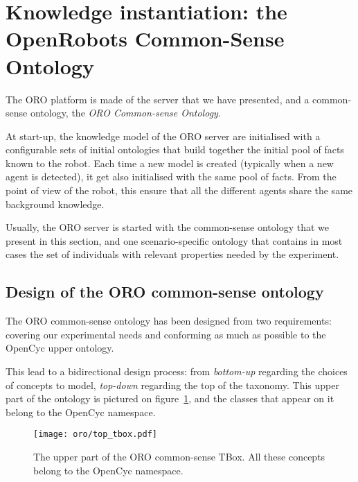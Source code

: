 
\section{Knowledge instantiation: the OpenRobots Common-Sense Ontology}

The ORO platform is made of the server that we have presented, and a
common-sense ontology, the \emph{ORO Common-sense Ontology}.

At start-up, the knowledge model of the ORO server are initialised with a
configurable sets of initial ontologies that build together the initial pool of
facts known to the robot. Each time a new model is created (typically when a
new agent is detected), it get also initialised with the same pool of facts.
From the point of view of the robot, this ensure that all the different agents
share the same background knowledge.

Usually, the ORO server is started with the common-sense ontology that we
present in this section, and one scenario-specific ontology that contains in
most cases the set of individuals with relevant properties needed by the
experiment.

\subsection{Design of the ORO common-sense ontology}
\label{sect|commonsense-design}

The ORO common-sense ontology has been designed from two requirements: covering
our experimental needs and conforming as much as possible to the {\sc OpenCyc}
upper ontology.

This lead to a bidirectional design process: from \emph{bottom-up} regarding
the choices of concepts to model, \emph{top-down} regarding the top of the
taxonomy. This upper part of the ontology is pictured on
figure~\ref{fig|upper_tbox}, and the classes that appear on it belong to the
{\sc OpenCyc} namespace.

\begin{figure}
    \centering
    \texttt{[image: oro/top\_tbox.pdf]}

    \caption{The upper part of the ORO common-sense TBox. All these concepts
    belong to the {\sc OpenCyc} namespace.}
    
    \label{fig|upper_tbox}
\end{figure}

